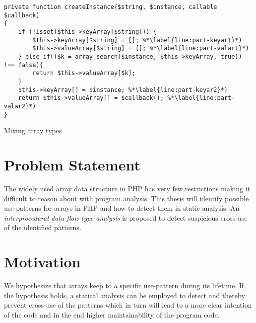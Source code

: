 




\begin{program}
\centering 
\begin{lstlisting}
private function createInstance($string, $instance, callable $callback)
{
    if (!isset($this->keyArray[$string])) {
        $this->keyArray[$string] = []; %*\label{line:part-keyar1}*)
        $this->valueArray[$string] = []; %*\label{line:part-valar1}*)
    } else if(($k = array_search($instance, $this->keyArray, true)) !== false){
        return $this->valueArray[$k];
    }
    $this->keyArray[] = $instance; %*\label{line:part-keyar2}*)
    return $this->valueArray[] = $callback(); %*\label{line:part-valar2}*)
}
\end{lstlisting}
\caption{Mixing array types}
\end{program}

\section{Problem Statement}
The widely used array data structure in PHP has very few restrictions making it difficult to reason about with program analysis. This thesis will identify possible use-patterns for arrays in PHP and how to detect them in static analysis. An \emph{interprocedural data-flow type-analysis} is proposed to detect suspicious cross-use of the identified patterns.

\section{Motivation}
We hypothesize that arrays keep to a specific use-pattern during its lifetime. If the hypothesis holds, a statical analysis can be employed to detect and thereby prevent cross-use of the patterns which in turn will lead to a more clear intention of the code and in the end higher maintainability of the program code.

